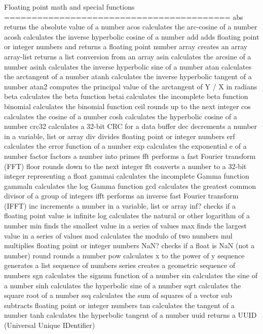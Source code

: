 \documentclass[cn,11pt]{elegantbook}
\begin{document}
Floating point math and special functions
=========================================
abs               returns the absolute value of a number
acos              calculates the arc-cosine of a number
acosh             calculates the inverse hyperbolic cosine of a number
add               adds floating point or integer numbers and returns a floating point number
array             creates an array
array-list        returns a list conversion from an array
asin              calculates the arcsine of a number
asinh             calculates the inverse hyperbolic sine of a number
atan              calculates the arctangent of a number
atanh             calculates the inverse hyperbolic tangent of a number
atan2             computes the principal value of the arctangent of Y / X in radians
beta              calculates the beta function
betai             calculates the incomplete beta function
binomial          calculates the binomial function
ceil              rounds up to the next integer
cos               calculates the cosine of a number
cosh              calculates the hyperbolic cosine of a number
crc32             calculates a 32-bit CRC for a data buffer
dec               decrements a number in a variable, list or array
div               divides floating point or integer numbers
erf               calculates the error function of a number
exp               calculates the exponential e of a number
factor            factors a number into primes
fft               performs a fast Fourier transform (FFT)
floor             rounds down to the next integer
flt               converts a number to a 32-bit integer representing a float
gammai            calculates the incomplete Gamma function
gammaln           calculates the log Gamma function
gcd               calculates the greatest common divisor of a group of integers
ifft              performs an inverse fast Fourier transform (IFFT)
inc               increments a number in a variable, list or array
inf?              checks if a floating point value is infinite
log               calculates the natural or other logarithm of a number
min               finds the smallest value in a series of values
max               finds the largest value in a series of values
mod               calculates the modulo of two numbers
mul               multiplies floating point or integer numbers
NaN?              checks if a float is NaN (not a number)
round             rounds a number
pow               calculates x to the power of y
sequence          generates a list sequence of numbers
series            creates a geometric sequence of numbers
sgn               calculates the signum function of a number
sin               calculates the sine of a number
sinh              calculates the hyperbolic sine of a number
sqrt              calculates the square root of a number
ssq               calculates the sum of squares of a vector
sub               subtracts floating point or integer numbers
tan               calculates the tangent of a number
tanh              calculates the hyperbolic tangent of a number
uuid              returns a UUID (Universal Unique IDentifier)
\end{document}
